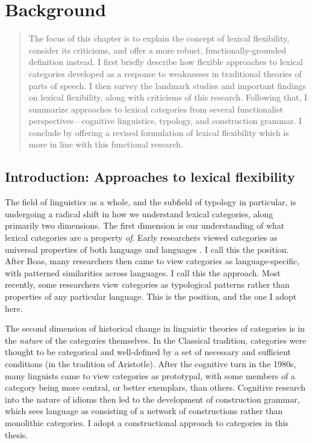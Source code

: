 \chapter{Background}
\label{ch:background}

\blockquote{The focus of this chapter is to explain the concept of lexical flexibility, consider its criticisms, and offer a more robust, functionally-grounded definition instead. I first briefly describe how flexible approaches to lexical categories developed as a response to weaknesses in traditional theories of parts of speech. I then survey the landmark studies and important findings on lexical flexibility, along with criticisms of this research. Following that, I summarize approaches to lexical categories from several functionalist perspectives—cognitive linguistics, typology, and construction grammar. I conclude by offering a revised formulation of lexical flexibility which is more in line with this functional research.}

\section{Introduction: Approaches to lexical flexibility}
\label{sec:2.1}

The field of linguistics as a whole, and the subfield of typology in particular, is undergoing a radical shift in how we understand lexical categories, along primarily two dimensions. The first dimension is our understanding of what lexical categories are a property \emph{of}. Early researchers viewed categories as universal properties of both language and languages . I call this the  position. After Boas, many researchers then came to view categories as language-specific, with patterned similarities across languages. I call this the  approach. Most recently, some researchers view categories as typological patterns rather than properties of any particular language. This is the  position, and the one I adopt here.

The second dimension of historical change in linguistic theories of categories is in the \emph{nature} of the categories themselves. In the Classical tradition, categories were thought to be categorical and well-defined by a set of necessary and sufficient conditions (in the tradition of Aristotle). After the cognitive turn in the 1980s, many linguists came to view categories as prototypal, with some members of a category being more central, or better exemplars, than others. Cognitive research into the nature of idioms then led to the development of construction grammar, which sees language as consisting of a network of constructions rather than monolithic categories. I adopt a constructional approach to categories in this thesis.


